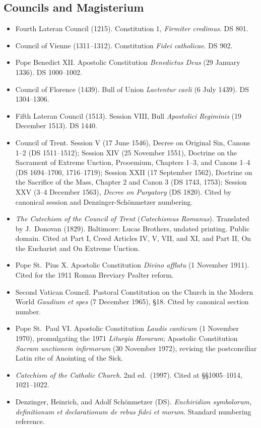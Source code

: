 \subsection*{Councils and Magisterium}

\begin{itemize}
\item Fourth Lateran Council (1215). Constitution 1, \textit{Firmiter credimus}. DS 801.
\item Council of Vienne (1311--1312). Constitution \textit{Fidei catholicae}. DS 902.
\item Pope Benedict XII. Apostolic Constitution \textit{Benedictus Deus} (29 January 1336). DS 1000--1002.
\item Council of Florence (1439). Bull of Union \textit{Laetentur caeli} (6 July 1439). DS 1304--1306.
\item Fifth Lateran Council (1513). Session VIII, Bull \textit{Apostolici Regiminis} (19 December 1513). DS 1440.
\item Council of Trent. Session V (17 June 1546), Decree on Original Sin, Canons 1--2 (DS 1511--1512); Session XIV (25 November 1551), Doctrine on the Sacrament of Extreme Unction, Prooemium, Chapters 1--3, and Canons 1--4 (DS 1694--1700, 1716--1719); Session XXII (17 September 1562), Doctrine on the Sacrifice of the Mass, Chapter 2 and Canon 3 (DS 1743, 1753); Session XXV (3--4 December 1563), \textit{Decree on Purgatory} (DS 1820). Cited by canonical session and Denzinger-Sch\"{o}nmetzer numbering.
\item \textit{The Catechism of the Council of Trent} (\textit{Catechismus Romanus}). Translated by J.\ Donovan (1829). Baltimore: Lucas Brothers, undated printing. Public domain. Cited at Part I, Creed Articles IV, V, VII, and XI, and Part II, On the Eucharist and On Extreme Unction.
\item Pope St.\ Pius X. Apostolic Constitution \textit{Divino afflatu} (1 November 1911). Cited for the 1911 Roman Breviary Psalter reform.
\item Second Vatican Council. Pastoral Constitution on the Church in the Modern World \textit{Gaudium et spes} (7 December 1965), \S 18. Cited by canonical section number.
\item Pope St.\ Paul VI. Apostolic Constitution \textit{Laudis canticum} (1 November 1970), promulgating the 1971 \textit{Liturgia Horarum}; Apostolic Constitution \textit{Sacram unctionem infirmorum} (30 November 1972), revising the postconciliar Latin rite of Anointing of the Sick.
\item \textit{Catechism of the Catholic Church}. 2nd ed.\ (1997). Cited at \S\S 1005--1014, 1021--1022.
\item Denzinger, Heinrich, and Adolf Sch\"{o}nmetzer (DS). \textit{Enchiridion symbolorum, definitionum et declarationum de rebus fidei et morum}. Standard numbering reference.
\end{itemize}

